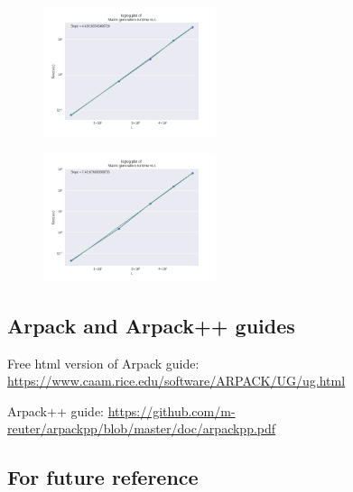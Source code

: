 \documentclass[%
 reprint,
 amsmath,amssymb,
 aps,
]{revtex4-2}
\begin{document}
\begin{figure}[h]
  \centering
  \includegraphics[width=0.45\textwidth]{./images/matrix_generation_loglog.png}
\end{figure}

\begin{figure}[h]
  \centering
  \includegraphics[width=0.45\textwidth]{./images/dggev_loglog.png}
\end{figure}

\subsection{Arpack and Arpack++ guides \label{appen:user_guides}}

Free html version of Arpack guide:
\href{https://www.caam.rice.edu/software/ARPACK/UG/ug.html}{https://www.caam.rice.edu/software/ARPACK/UG/ug.html}




Arpack++ guide:
\href{https://github.com/m-reuter/arpackpp/blob/master/doc/arpackpp.pdf}{https://github.com/m-reuter/arpackpp/blob/master/doc/arpackpp.pdf}


\subsection{For future reference \label{appen:for_future_reference}}
\end{document}
